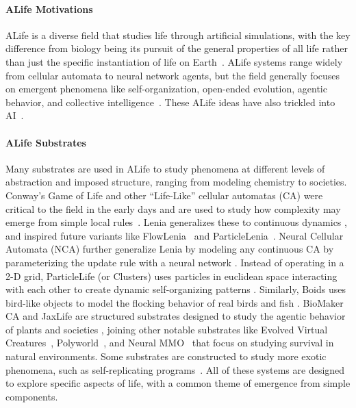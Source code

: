 \documentclass{article}
\begin{document}
\paragraph{ALife Motivations}
ALife is a diverse field that studies life through artificial simulations, with the key difference from biology being its pursuit of the general properties of all life rather than just the specific instantiation of life on Earth~\citep{langton1992artificial}.
ALife systems range widely from cellular automata to neural network agents, but the field generally focuses on emergent phenomena like self-organization, open-ended evolution, agentic behavior, and collective intelligence~\citep{aguilar2014past}.
These ALife ideas have also trickled into AI~\citep{nisioti2024text, risi2021future, jiang2023general, ha2022collective, clune2019ai, hughes2024open, schmidhuber2013powerplay, silver2017mastering, wang2020enhanced, dennis2020emergent, parker2022evolving}.



\paragraph{ALife Substrates}
Many substrates are used in ALife to study phenomena at different levels of abstraction and imposed structure, ranging from modeling chemistry to societies.
Conway's Game of Life and other ``Life-Like'' cellular automatas (CA) were critical to the field in the early days and are used to study how complexity may emerge from simple local rules~\citep{games1970fantastic, wolfram2003new}.
Lenia generalizes these to continuous dynamics \citep{chan2018lenia, chan2020lenia, chan2023towards}, and inspired future variants like FlowLenia~\citep{plantec2023flow} and ParticleLenia~\citep{mordvintsev2022particle}.
Neural Cellular Automata (NCA) further generalize Lenia by modeling any continuous CA by parameterizing the update rule with a neural network \citep{mordvintsev2020growing}. 
Instead of operating in a 2-D grid, ParticleLife (or Clusters) uses particles in euclidean space interacting with each other to create dynamic self-organizing patterns \citep{ventrella2017clusters, mohr2023particlelife}.
Similarly, Boids uses bird-like objects to model the flocking behavior of real birds and fish \citep{reynolds1987flocks}.
BioMaker CA and JaxLife are structured substrates designed to study the agentic behavior of plants and societies \citep{lu2024jaxlife, randazzo2023biomaker}, joining other notable substrates like Evolved Virtual Creatures~\citep{SimsKarl1994}, Polyworld~\citep{yaeger1994computational}, and Neural MMO~\citep{suarez2019neural} that focus on studying survival in natural environments.
Some substrates are constructed to study more exotic phenomena, such as self-replicating programs~\citep{ofria2004avida, alakuijala2024computational}.
All of these systems are designed to explore specific aspects of life, with a common theme of emergence from simple components.
\end{document}

